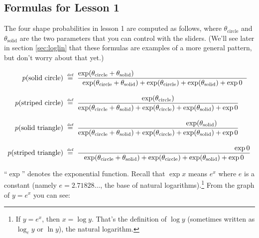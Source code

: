 \documentclass[11pt]{article}
\newcommand{\defeq}{\;\stackrel{\mbox{\tiny def}}{=}\;}
\begin{document}
\subsection{Formulas for Lesson 1}

The four shape probabilities in lesson 1 are computed as follows,
where $\theta_{\textrm{circle}}$ and $\theta_{\textrm{solid}}$ are the
two parameters that you can control with the sliders.  (We'll see later
in section \ref{sec:loglin} that these formulas are examples of a more
general pattern, but don't worry about that yet.)


\begin{align}
p(\text{solid circle}) & \defeq \frac{\exp (\theta_{\textrm{circle}}+\theta_{\textrm{solid}})\hspace{57mm}}{\exp (\theta_{\textrm{circle}} + \theta_{\textrm{solid}}) + \exp (\theta_{\textrm{circle}}) + \exp (\theta_{\textrm{solid}}) + \exp 0} \label{eqn:solidcircle}\\
\rule{0in}{1.5\baselineskip}
p(\text{striped circle}) & \defeq \frac{\exp (\theta_{\textrm{circle}})\hspace{0mm}}{\exp (\theta_{\textrm{circle}} + \theta_{\textrm{solid}}) + \exp (\theta_{\textrm{circle}}) + \exp (\theta_{\textrm{solid}}) + \exp 0} \label{eqn:stripedcircle}\\
\rule{0in}{1.5\baselineskip}
p(\text{solid triangle}) & \defeq \frac{\hspace{44mm}\exp (\theta_{\textrm{solid}})}{\exp (\theta_{\textrm{circle}} + \theta_{\textrm{solid}}) + \exp (\theta_{\textrm{circle}}) + \exp (\theta_{\textrm{solid}}) + \exp 0} \label{eqn:solidtriangle}\\
\rule{0in}{1.5\baselineskip}
p(\text{striped triangle}) & \defeq \frac{\hspace{79mm}\exp 0}{\exp (\theta_{\textrm{circle}} + \theta_{\textrm{solid}}) + \exp (\theta_{\textrm{circle}}) + \exp (\theta_{\textrm{solid}}) + \exp 0} \label{eqn:stripedtriangle}
\end{align}

``$\exp$'' denotes the exponential function.  Recall that $\exp x$ means
$e^x$ where $e$ is a constant (namely $e=2.71828\ldots$, the base of
natural logarithms).\footnote{If $y=e^x$, then $x=\log y$.  That's the
  definition of $\log y$ (sometimes written as $\log_e y$ or $\ln y$),
  the natural logarithm.}  From the graph of $y=e^x$ you can see:
\end{document}
